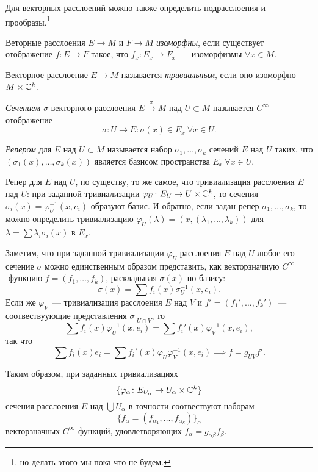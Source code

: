     Для векторных расслоений можно также определить подрасслоения и прообразы.\footnote{но делать этого мы пока что не будем.}

    \begin{definition} 
        Веторные расслоения $E \to M$ и $F \to M$ \emph{изоморфны}, если существует отображение $f\colon E \to F$ такое, что $f_{x}\colon E_{x} \to F_{x}$~--- изоморфизмы $\forall x \in M$.

        Векторное расслоение $E \to M$ называется \emph{тривиальным}, если оно изоморфно $M \times \mathbb{C}^k$.

        \emph{Сечением $\sigma$} векторного расслоения $E \xrightarrow{\pi} M$ над $U \subset M$ называется $C^{\infty}$ отображение 
        \[ \sigma\colon U \to E\colon \sigma(x) \in E_x \ \forall x \in U. \]

        \emph{Репером} для $E$ над $U \subset M$ называется набор $\sigma_1, \ldots, \sigma_k$ сечений $E$ над $U$ таких, что 
        $(\sigma_1(x), \ldots, \sigma_k(x))$ является базисом пространства $E_x \ \forall x \in U$.
    \end{definition}

    Репер для $E$ над $U$, по существу, то же самое, что тривиализация расслоения $E$ над $U$: при заданной тривиализации $\varphi_{U}\colon E_{U} \to U \times \mathbb{C}^k$, то сечения $\sigma_i(x) = \varphi_U^{-1}(x, e_i)$ образуют базис. И обратно, если задан репер $\sigma_1, \ldots, \sigma_k$, то можно определить тривиализацию $\varphi_U(\lambda) = (x, (\lambda_1, \ldots, \lambda_k))$ для $\lambda = \sum \lambda_i \sigma_i(x)$ в $E_x$. 

    Заметим, что при заданной тривиализации $\varphi_U$ расслоения $E$ над $U$ любое его сечение $\sigma$ можно единственным образом представить, как векторзначную $C^{\infty}$-функцию $f = (f_1, \ldots, f_k)$, раскладывая $\sigma(x)$ по базису: 
    \[
        \sigma(x) = \sum f_i(x) \sigma^{-1}_{U}(x, e_i).
    \]
    Если же $\varphi_{V}$~--- тривиализация расслоения $E$ над $V$ и $f' = (f_1', \ldots, f_k')$~--- соотвествуующие представления $\sigma\vert_{U \cap V}$, то 
    \[
        \sum f_i(x) \varphi_{U}^{-1}(x, e_i) = \sum f_i'(x) \varphi_{V}^{-1}(x, e_i),
    \]
    так что 
    \[ \sum f_i(x) e_i = \sum f_i'(x) \varphi_U \varphi_{V}^{-1}(x, e_i) \implies f = g_{UV} f'. \]

    Таким образом, при заданных тривиализациях 
    \[
        \{ \varphi_{\alpha}\colon E_{U_{\alpha}} \to U_{\alpha} \times \mathbb{C}^k \}
    \]
    сечения расслоения $E$ над $\bigcup U_{\alpha}$ в точности соотвествуют наборам 
    \[
        \{ f_{\alpha} = (f_{\alpha_1}, \ldots, f_{\alpha_k})\}_{\alpha}
    \]
    векторзначных $C^\infty$ функций, удовлетворяющих $f_\alpha = g_{\alpha \beta} f_{\beta}$.
    
